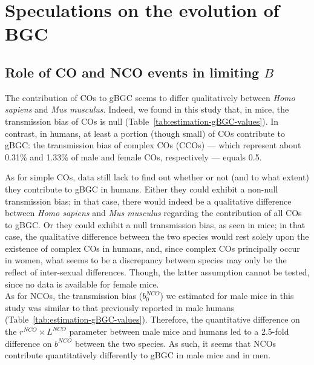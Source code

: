 



\section{Speculations on the evolution of BGC}
\subsection{Role of CO and NCO events in limiting $B$}

The contribution of COs to gBGC seems to differ qualitatively between \textit{Homo sapiens} and \textit{Mus musculus}.
Indeed, we found in this study that, in mice, the transmission bias of COs is null (Table~\ref{tab:estimation-gBGC-values}).
In contrast, in humans, at least a portion (though small) of COs contribute to gBGC\@: the transmission bias of complex COs (CCOs) — which represent about 0.31\% and 1.33\% of male and female COs, respectively \citep{webb2008sperm, halldorsson2016rate} — equals 0.5.

As for simple COs, data still lack to find out whether or not (and to what extent) they contribute to gBGC in humans.
Either they could exhibit a non-null transmission bias; in that case, there would indeed be a qualitative difference between \textit{Homo sapiens} and \textit{Mus musculus} regarding the contribution of all COs to gBGC\@.
Or they could exhibit a null transmission bias, as seen in mice; in that case, the qualitative difference between the two species would rest solely upon the existence of complex COs in humans, and, since complex COs principally occur in women, what seems to be a discrepancy between species may only be the reflect of inter-sexual differences. Though, the latter assumption cannot be tested, since no data is available for female mice.\\


As for NCOs, the transmission bias ($b_0^{NCO}$) we estimated for male mice in this study was similar to that previously reported in male humans (Table~\ref{tab:estimation-gBGC-values}).
Therefore, the quantitative difference on the $r^{NCO} \times L^{NCO}$ parameter between male mice and humans led to a 2.5-fold difference on $b^{NCO}$ between the two species.
As such, it seems that NCOs contribute quantitatively differently to gBGC in male mice and in men.

